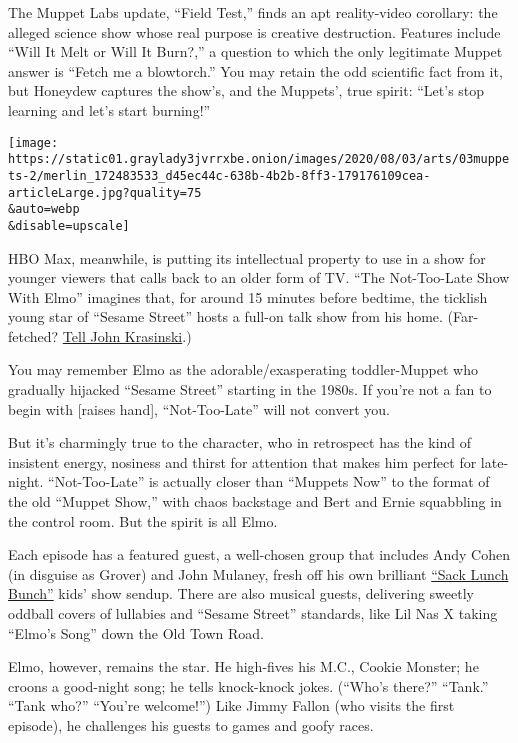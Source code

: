 The Muppet Labs update, ``Field Test,'' finds an apt reality-video
corollary: the alleged science show whose real purpose is creative
destruction. Features include ``Will It Melt or Will It Burn?,'' a
question to which the only legitimate Muppet answer is ``Fetch me a
blowtorch.'' You may retain the odd scientific fact from it, but
Honeydew captures the show's, and the Muppets', true spirit: ``Let's
stop learning and let's start burning!''

\texttt{[image: https://static01.graylady3jvrrxbe.onion/images/2020/08/03/arts/03muppets-2/merlin\_172483533\_d45ec44c-638b-4b2b-8ff3-179176109cea-articleLarge.jpg?quality=75\\\&auto=webp\\\&disable=upscale]}

HBO Max, meanwhile, is putting its intellectual property to use in a
show for younger viewers that calls back to an older form of TV. ``The
Not-Too-Late Show With Elmo'' imagines that, for around 15 minutes
before bedtime, the ticklish young star of ``Sesame Street'' hosts a
full-on talk show from his home. (Far-fetched?
\href{https://www.nytimes3xbfgragh.onion/2020/04/29/arts/television/john-krasinski-some-good-news.html}{Tell
John Krasinski}.)

You may remember Elmo as the adorable/exasperating toddler-Muppet who
gradually hijacked ``Sesame Street'' starting in the 1980s. If you're
not a fan to begin with {[}raises hand{]}, ``Not-Too-Late'' will not
convert you.

But it's charmingly true to the character, who in retrospect has the
kind of insistent energy, nosiness and thirst for attention that makes
him perfect for late-night. ``Not-Too-Late'' is actually closer than
``Muppets Now'' to the format of the old ``Muppet Show,'' with chaos
backstage and Bert and Ernie squabbling in the control room. But the
spirit is all Elmo.

Each episode has a featured guest, a well-chosen group that includes
Andy Cohen (in disguise as Grover) and John Mulaney, fresh off his own
brilliant
\href{https://www.nytimes3xbfgragh.onion/2019/12/24/arts/television/john-mulaney-sack-lunch-bunch-netflix.html}{``Sack
Lunch Bunch''} kids' show sendup. There are also musical guests,
delivering sweetly oddball covers of lullabies and ``Sesame Street''
standards, like Lil Nas X taking ``Elmo's Song'' down the Old Town Road.

Elmo, however, remains the star. He high-fives his M.C., Cookie Monster;
he croons a good-night song; he tells knock-knock jokes. (``Who's
there?'' ``Tank.'' ``Tank who?'' ``You're welcome!'') Like Jimmy Fallon
(who visits the first episode), he challenges his guests to games and
goofy races.

